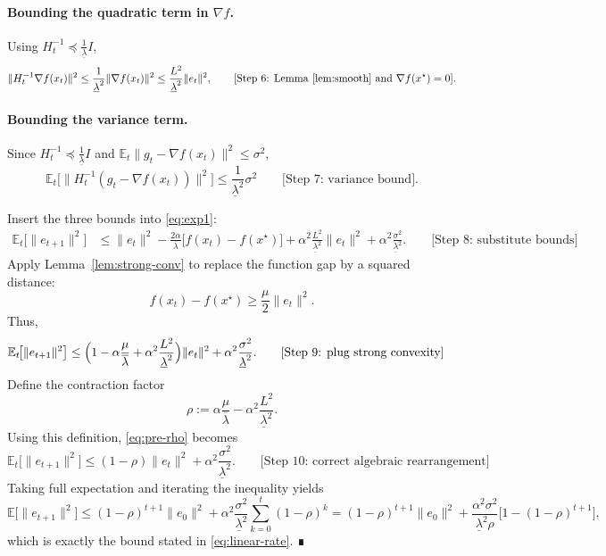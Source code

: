 \documentclass{article}
\newcommand{\E}{\mathbb{E}}
\begin{document}
\paragraph{Bounding the quadratic term in $\nabla f$.}
Using $H_{t}^{-1}\preceq \frac{1}{\underline{\lambda}}I$,
\[
\|H_{t}^{-1}\nabla f(x_{t})\|^{2}
\le \frac{1}{\underline{\lambda}^{2}}\|\nabla f(x_{t})\|^{2}
\le \frac{L^{2}}{\underline{\lambda}^{2}}\|e_{t}\|^{2},
\qquad\text{[Step 6: Lemma~\ref{lem:smooth} and $\nabla f(x^{\star})=0$]}.
\]

\paragraph{Bounding the variance term.}
Since $H_{t}^{-1}\preceq \frac{1}{\underline{\lambda}}I$ and $\E_{t}\|g_{t}-\nabla f(x_{t})\|^{2}\le\sigma^{2}$,
\[
\E_{t}\!\big[\|H_{t}^{-1}(g_{t}-\nabla f(x_{t}))\|^{2}\big]
\le \frac{1}{\underline{\lambda}^{2}}\sigma^{2}
\qquad\text{[Step 7: variance bound].}
\]

Insert the three bounds into \eqref{eq:exp1}:
\begin{align}
\E_{t}\!\big[\|e_{t+1}\|^{2}\big]
&\le \|e_{t}\|^{2}
   -\frac{2\alpha}{\overline{\lambda}}\bigl[f(x_{t})-f(x^{\star})\bigr]
   +\alpha^{2}\frac{L^{2}}{\underline{\lambda}^{2}}\|e_{t}\|^{2}
   +\alpha^{2}\frac{\sigma^{2}}{\underline{\lambda}^{2}}.
   \qquad\text{[Step 8: substitute bounds]} \label{eq:intermediate}
\end{align}
Apply Lemma~\ref{lem:strong-conv} to replace the function gap by a squared distance:
\[
f(x_{t})-f(x^{\star})\ge \frac{\mu}{2}\|e_{t}\|^{2}.
\]
Thus,
\begin{align}
\E_{t}\!\big[\|e_{t+1}\|^{2}\big]
&\le \Bigl(1-\alpha\frac{\mu}{\overline{\lambda}}+\alpha^{2}\frac{L^{2}}{\underline{\lambda}^{2}}\Bigr)\|e_{t}\|^{2}
   +\alpha^{2}\frac{\sigma^{2}}{\underline{\lambda}^{2}}.
   \qquad\text{[Step 9: plug strong convexity]} \label{eq:pre-rho}
\end{align}
Define the contraction factor
\[
\rho:=\alpha\frac{\mu}{\overline{\lambda}}-\alpha^{2}\frac{L^{2}}{\underline{\lambda}^{2}}.
\]
Using this definition, \eqref{eq:pre-rho} becomes
\[
\E_{t}\!\big[\|e_{t+1}\|^{2}\big]\le (1-\rho)\|e_{t}\|^{2}
    +\alpha^{2}\frac{\sigma^{2}}{\underline{\lambda}^{2}}.
    \qquad\text{[Step 10: correct algebraic rearrangement]}\label{eq:recurrence}
\]
Taking full expectation and iterating the inequality yields
\[
\E\!\big[\|e_{t+1}\|^{2}\big]\le (1-\rho)^{t+1}\|e_{0}\|^{2}
   +\alpha^{2}\frac{\sigma^{2}}{\underline{\lambda}^{2}}
     \sum_{k=0}^{t}(1-\rho)^{k}
   = (1-\rho)^{t+1}\|e_{0}\|^{2}
     +\frac{\alpha^{2}\sigma^{2}}{\underline{\lambda}^{2}\rho}
       \bigl[1-(1-\rho)^{t+1}\bigr],
\]
which is exactly the bound stated in \eqref{eq:linear-rate}.  ∎
\end{document}
